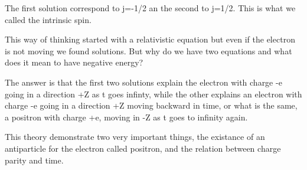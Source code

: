 The first solution correspond to j=-1/2 an the second to j=1/2. This is what we called the intrinsic spin.


This way of thinking started with a relativistic equation but even if the electron is not moving we found solutions. But why do we have two equations and what does it mean to have negative energy?

The answer is that the first two solutions explain the electron with charge -e going in a direction +Z as t goes infinty, while the other explains an electron with charge -e going in a direction +Z moving backward in time, or what is the same, a positron with charge +e, moving in -Z as t goes to infinity again.

This theory demonstrate two very important things, the existance of an antiparticle for the electron called positron, and the relation between charge parity and time.
